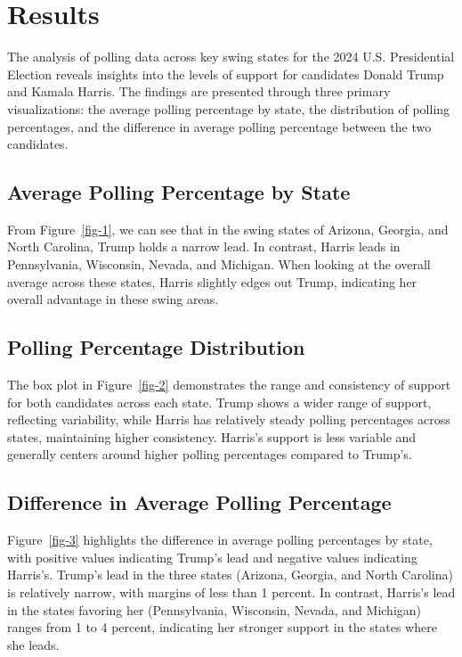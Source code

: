 \documentclass[
  letterpaper,
  DIV=11,
  numbers=noendperiod]{scrartcl}
\begin{document}
\hypertarget{results}{%
\section{Results}\label{results}}

The analysis of polling data across key swing states for the 2024 U.S.
Presidential Election reveals insights into the levels of support for
candidates Donald Trump and Kamala Harris. The findings are presented
through three primary visualizations: the average polling percentage by
state, the distribution of polling percentages, and the difference in
average polling percentage between the two candidates.

\hypertarget{average-polling-percentage-by-state}{%
\subsection{Average Polling Percentage by
State}\label{average-polling-percentage-by-state}}

From Figure~\ref{fig-1}, we can see that in the swing states of Arizona,
Georgia, and North Carolina, Trump holds a narrow lead. In contrast,
Harris leads in Pennsylvania, Wisconsin, Nevada, and Michigan. When
looking at the overall average across these states, Harris slightly
edges out Trump, indicating her overall advantage in these swing areas.

\hypertarget{polling-percentage-distribution}{%
\subsection{Polling Percentage
Distribution}\label{polling-percentage-distribution}}

The box plot in Figure~\ref{fig-2} demonstrates the range and
consistency of support for both candidates across each state. Trump
shows a wider range of support, reflecting variability, while Harris has
relatively steady polling percentages across states, maintaining higher
consistency. Harris's support is less variable and generally centers
around higher polling percentages compared to Trump's.

\hypertarget{difference-in-average-polling-percentage}{%
\subsection{Difference in Average Polling
Percentage}\label{difference-in-average-polling-percentage}}

Figure~\ref{fig-3} highlights the difference in average polling
percentages by state, with positive values indicating Trump's lead and
negative values indicating Harris's. Trump's lead in the three states
(Arizona, Georgia, and North Carolina) is relatively narrow, with
margins of less than 1 percent. In contrast, Harris's lead in the states
favoring her (Pennsylvania, Wisconsin, Nevada, and Michigan) ranges from
1 to 4 percent, indicating her stronger support in the states where she
leads.
\end{document}
